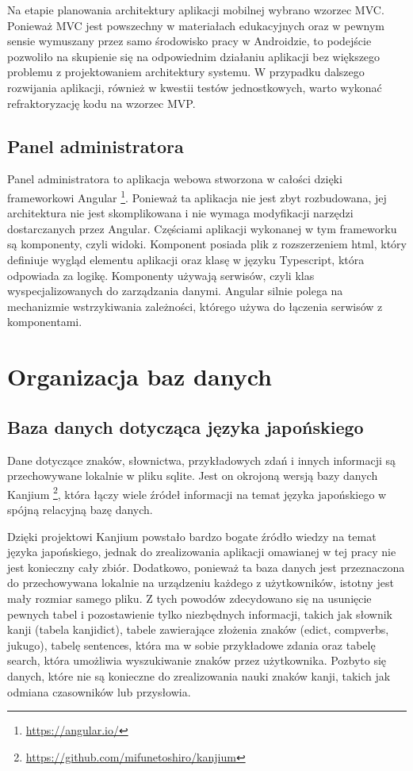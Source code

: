 \documentclass[a4paper,twoside,12pt]{book}
\begin{document}
Na etapie planowania architektury aplikacji mobilnej wybrano wzorzec MVC. Ponieważ MVC jest powszechny w materiałach edukacyjnych oraz w pewnym sensie wymuszany przez samo środowisko pracy w Androidzie, to podejście pozwoliło na skupienie się na odpowiednim działaniu aplikacji bez większego problemu z projektowaniem architektury systemu. W przypadku dalszego rozwijania aplikacji, również w kwestii testów jednostkowych, warto wykonać refraktoryzację kodu na wzorzec MVP. 

\subsection{Panel administratora}

Panel administratora to aplikacja webowa stworzona w całości dzięki frameworkowi Angular \footnote{\url{https://angular.io/}}. Ponieważ ta aplikacja nie jest zbyt rozbudowana, jej architektura nie jest skomplikowana i nie wymaga modyfikacji narzędzi dostarczanych przez Angular. Częściami aplikacji wykonanej w tym frameworku są komponenty, czyli widoki. Komponent posiada plik z rozszerzeniem html, który definiuje wygląd elementu aplikacji oraz klasę w języku Typescript, która odpowiada za logikę. Komponenty używają serwisów, czyli klas wyspecjalizowanych do zarządzania danymi. Angular silnie polega na mechanizmie wstrzykiwania zależności, którego używa do łączenia serwisów z komponentami. 

\section{Organizacja baz danych}

\subsection{Baza danych dotycząca języka japońskiego}

Dane dotyczące znaków, słownictwa, przykładowych zdań i innych informacji są przechowywane lokalnie w pliku sqlite. Jest on okrojoną wersją bazy danych Kanjium \footnote{\url{https://github.com/mifunetoshiro/kanjium}}, która łączy wiele źródeł informacji na temat języka japońskiego w spójną relacyjną bazę danych. 

Dzięki projektowi Kanjium powstało bardzo bogate źródło wiedzy na temat języka japońskiego, jednak do zrealizowania aplikacji omawianej w tej pracy nie jest konieczny cały zbiór. Dodatkowo, ponieważ ta baza danych jest przeznaczona do przechowywana lokalnie na urządzeniu każdego z użytkowników, istotny jest mały rozmiar samego pliku. Z tych powodów zdecydowano się na usunięcie pewnych tabel i pozostawienie tylko niezbędnych informacji, takich jak słownik kanji (tabela kanjidict), tabele zawierające złożenia znaków (edict, compverbs, jukugo), tabelę sentences, która ma w sobie przykładowe zdania oraz tabelę search, która umożliwia wyszukiwanie znaków przez użytkownika. Pozbyto się danych, które nie są konieczne do zrealizowania nauki znaków kanji, takich jak odmiana czasowników lub przysłowia.
\end{document}
